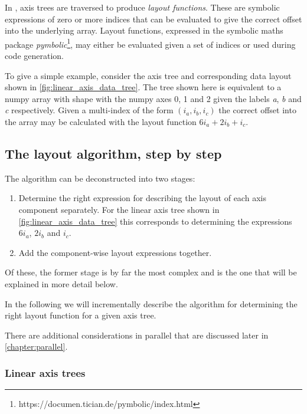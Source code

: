 \documentclass[thesis]{subfiles}
\begin{document}
In , axis trees are traversed to produce \textit{layout functions}.
These are symbolic expressions of zero or more indices that can be evaluated to give the correct offset into the underlying array.
Layout functions, expressed in the symbolic maths package \textit{pymbolic}\footnote{https://documen.tician.de/pymbolic/index.html}, may either be evaluated given a set of indices or used during code generation.

To give a simple example, consider the axis tree and corresponding data layout shown in \cref{fig:linear_axis_data_tree}.
The tree shown here is equivalent to a numpy array with shape  with the numpy axes 0, 1 and 2 given the labels \textit{a}, \textit{b} and \textit{c} respectively.
Given a multi-index of the form $(i_a, i_b, i_c)$ the correct offset into the array may be calculated with the layout function $6 i_a + 2 i_b + i_c$.

\subsection{The layout algorithm, step by step}

The algorithm can be deconstructed into two stages:
\begin{enumerate}
  \item
    Determine the right expression for describing the layout of each axis component separately.
    For the linear axis tree shown in \cref{fig:linear_axis_data_tree} this corresponds to determining the expressions $6 i_a$, $2 i_b$ and $i_c$.
  \item
    Add the component-wise layout expressions together.
\end{enumerate}
Of these, the former stage is by far the most complex and is the one that will be explained in more detail below.

In the following we will incrementally describe the algorithm for determining the right layout function for a given axis tree.

There are additional considerations in parallel that are discussed later in \cref{chapter:parallel}.

\subsubsection{Linear axis trees}
\end{document}

